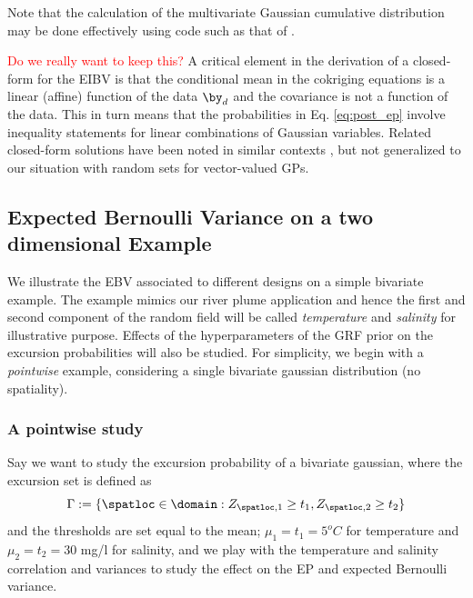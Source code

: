 Note that the calculation of the multivariate Gaussian cumulative distribution
may be done effectively using code such as that of
\cite{genz2009computation}. 

\textcolor{red}{Do we really want to keep this?}
A critical element in the derivation of a closed-form for the EIBV is
that the conditional mean in the cokriging equations is a linear
(affine) function of the data $\by_d$ and the covariance is not a
function of the data. This in turn means that the probabilities in Eq.
\eqref{eq:post_ep} involve inequality statements for linear
combinations of Gaussian variables. Related closed-form solutions have
been noted in similar contexts \citep{bhattacharjya2013value,
  chevalier2014fast,stroh}, but not generalized to our situation with
random sets for vector-valued GPs.











\subsection{Expected Bernoulli Variance on a two dimensional Example}
\label{Sec:UnivarEx}
We illustrate the EBV associated to different designs on a simple bivariate example. The example mimics our river plume application and hence the first and second component of the random field will be called \textit{temperature} and \textit{salinity} for illustrative purpose. Effects of the hyperparameters of the GRF prior on the excursion probabilities will also be studied. For simplicity, we begin with a \textit{pointwise} example, considering a single bivariate gaussian distribution (no spatiality).

\subsubsection{A pointwise study}
Say we want to study the excursion probability of a bivariate gaussian, where the excursion set is defined as
\[
\Gamma := \lbrace \spatloc \in \domain: Z_{\spatloc, 1} \geq t_1, Z_{\spatloc, 2}\geq t_2\rbrace
\]
and the thresholds are set equal to the mean; $\mu_1=t_1=5^o C$ for temperature and  $\mu_2=t_2=30$ mg/l for salinity, and we play with the temperature and salinity correlation and variances to study the effect on the EP and expected Bernoulli variance.

